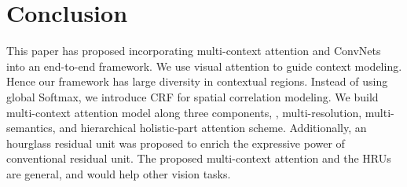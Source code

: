 \documentclass[10pt,twocolumn,letterpaper]{article}
\begin{document}
\section{Conclusion}
This paper has proposed incorporating multi-context attention and ConvNets into an end-to-end framework. 
We use visual attention to guide context modeling. 
Hence our framework has large diversity in contextual regions. 
Instead of using global Softmax, we introduce CRF for spatial correlation modeling. 
We build multi-context attention model along three components, 
\ie, multi-resolution, multi-semantics, and  hierarchical holistic-part attention scheme.
Additionally, an hourglass residual unit was proposed to enrich the expressive power of conventional residual unit. 
The proposed multi-context attention and the HRUs are general, and would help other vision tasks.
{\small


}
\end{document}
